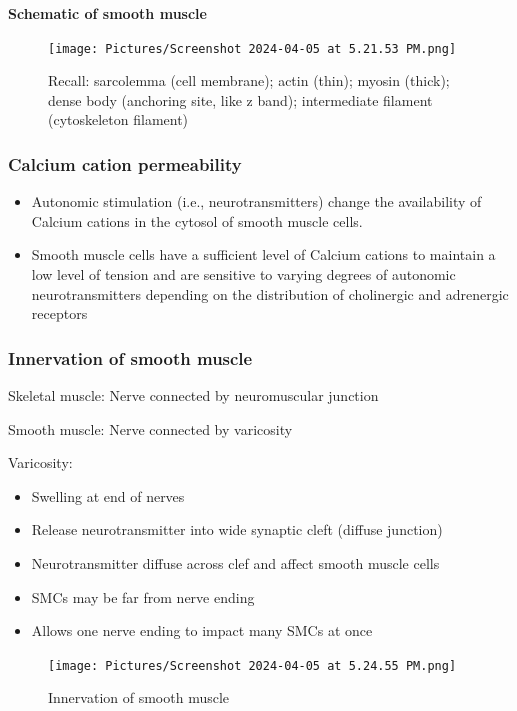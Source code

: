 \documentclass[11pt,fleqn]{book} %
\begin{document}
\textbf{Schematic of smooth muscle}
\begin{figure}[h!]
\begin{center}
    \texttt{[image: Pictures/Screenshot 2024-04-05 at 5.21.53 PM.png]}
\end{center}
    \caption{Recall: sarcolemma (cell membrane); actin (thin); myosin (thick); dense body (anchoring site, like z band); intermediate filament (cytoskeleton filament)}
\end{figure}

\subsubsection{Calcium cation permeability}
\begin{itemize}
    \item Autonomic stimulation (i.e., neurotransmitters)
change the availability of Calcium cations in the cytosol of
smooth muscle cells.
    \item Smooth muscle cells have a sufficient level of Calcium cations
to maintain a low level of tension and are sensitive
to varying degrees of autonomic neurotransmitters
depending on the distribution of cholinergic and
adrenergic receptors
\end{itemize}

\subsubsection{Innervation of smooth muscle}
\begin{descriptions}
    \item[Skeletal muscle: ]Nerve connected by neuromuscular junction
    \item[Smooth muscle: ]Nerve connected by varicosity
    \item[Varicosity: ]\begin{descriptions}
    \end{descriptions} 
    \begin{itemize}
        \item Swelling at end of nerves
        \item Release neurotransmitter into wide synaptic cleft (diffuse
junction)
        \item Neurotransmitter diffuse across clef and affect smooth
muscle cells
        \item SMCs may be far from nerve ending
        \item Allows one nerve ending to impact many SMCs at once
    \end{itemize}
\end{descriptions}
\begin{figure}[h!]
\begin{center}
    \texttt{[image: Pictures/Screenshot 2024-04-05 at 5.24.55 PM.png]}
\end{center}
    \caption{Innervation of smooth muscle}
\end{figure}
\end{document}
